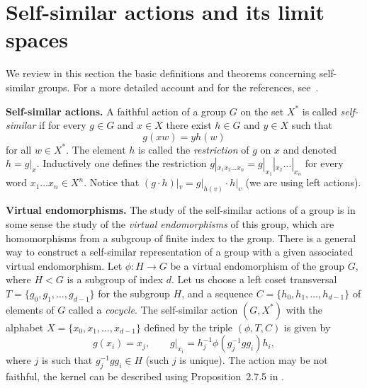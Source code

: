 \documentclass[12pt]{article}
\theoremstyle{definition}
\begin{document}


\section{Self-similar actions and its limit spaces}\label{section_Self-similar_groups}
We review in this section the basic definitions and theorems concerning self-similar groups. For a
more detailed account and for the references, see~\cite{self_sim_groups}.

\textbf{Self-similar actions.} A faithful action of a group $G$ on the set $X^*$ is called
\emph{self-similar} if for every $g\in G$ and $x\in X$ there exist $h\in G$ and $y\in X$ such that
\[
g(xw)=yh(w)
\]
for all $w\in X^*$. The element $h$ is called the \textit{restriction} of $g$ on $x$ and denoted
$h=g|_x$. Inductively one defines the restriction $g|_{x_1x_2\ldots x_n}=g|_{x_1}|_{x_2}\ldots
|_{x_n}$ for every word $x_1\ldots x_n\in X^n$. Notice that $(g\cdot h)|_v=g|_{h(v)}\cdot h|_v$ (we
are using left actions).




\textbf{Virtual endomorphisms.} The study of the self-similar actions of a group is in some sense
the study of the \textit{virtual endomorphisms} of this group, which are homomorphisms from a
subgroup of finite index to the group. There is a general way to construct a self-similar
representation of a group with a given associated virtual endomorphism. Let $\phi: H\rightarrow G$
be a virtual endomorphism of the group $G$, where $H<G$ is a subgroup of index $d$. Let us choose a
left coset transversal $T=\{g_0,g_1,\ldots,g_{d-1}\}$ for the subgroup $H$, and a sequence
$C=\{h_0,h_1,\ldots,h_{d-1}\}$ of elements of $G$ called a \emph{cocycle}. The self-similar action
$(G,X^{*})$ with the alphabet $X=\{x_0,x_1,\ldots,x_{d-1}\}$ defined by the triple $(\phi,T,C)$ is
given by
\[
g(x_i)=x_j,\qquad g|_{x_i}=h_j^{-1}\phi(g_j^{-1}gg_i)h_i,
\]
where $j$ is such that $g_j^{-1}gg_i\in H$ (such $j$ is unique). The action may be not faithful,
the kernel can be described using Proposition~2.7.5 in \cite{self_sim_groups}.
\end{document}
